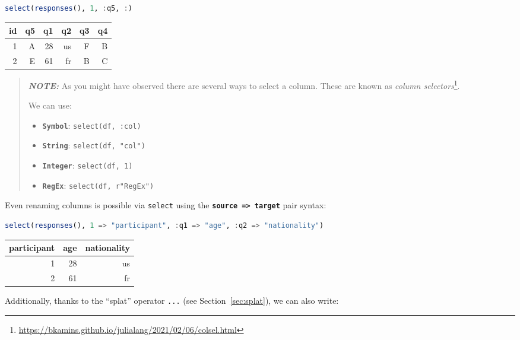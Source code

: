 \documentclass[
  notoc %
]{tufte-book}
\DeclareRobustCommand{\href}[2]{#2\footnote{\url{#1}}}
\providecommand{\tightlist}{%
  \setlength{\itemsep}{0pt}\setlength{\parskip}{0pt}
}
\newcommand{\passthrough}[1]{#1}
\begin{document}
\begin{lstlisting}[language=Julia]
select(responses(), 1, :q5, :)
\end{lstlisting}

\begin{longtable}[]{@{}rrrrrr@{}}
\toprule
id & q5 & q1 & q2 & q3 & q4 \\
\midrule
\endhead
1 & A & 28 & us & F & B \\
2 & E & 61 & fr & B & C \\
\bottomrule
\end{longtable}

\begin{quote}
\textbf{\emph{NOTE:}} As you might have observed there are several ways
to select a column. These are known as
\href{https://bkamins.github.io/julialang/2021/02/06/colsel.html}{\emph{column
selectors}}.

We can use:

\begin{itemize}
\tightlist
\item
  \textbf{\passthrough{\lstinline!Symbol!}}:
  \passthrough{\lstinline!select(df, :col)!}
\item
  \textbf{\passthrough{\lstinline!String!}}:
  \passthrough{\lstinline!select(df, "col")!}
\item
  \textbf{\passthrough{\lstinline!Integer!}}:
  \passthrough{\lstinline!select(df, 1)!}
\item
  \textbf{\passthrough{\lstinline!RegEx!}}:
  \passthrough{\lstinline!select(df, r"RegEx")!}
\end{itemize}
\end{quote}

Even renaming columns is possible via \passthrough{\lstinline!select!}
using the \textbf{\passthrough{\lstinline!source => target!}} pair
syntax:

\begin{lstlisting}[language=Julia]
select(responses(), 1 => "participant", :q1 => "age", :q2 => "nationality")
\end{lstlisting}

\begin{longtable}[]{@{}rrr@{}}
\toprule
participant & age & nationality \\
\midrule
\endhead
1 & 28 & us \\
2 & 61 & fr \\
\bottomrule
\end{longtable}

Additionally, thanks to the ``splat'' operator
\passthrough{\lstinline!...!} (see Section~\ref{sec:splat}), we can also
write:
\end{document}
